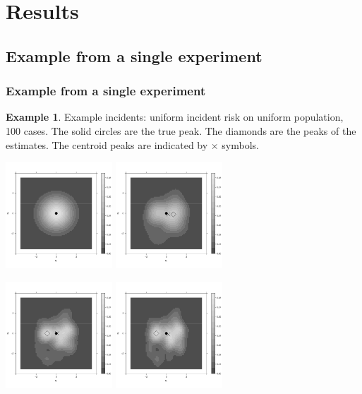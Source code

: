 \documentclass[notheorems]{beamer}
\theoremstyle{definition}
\theoremstyle{example}
\newtheorem{example}{Example}
\begin{document}
\section{Results}

\subsection{Example from a single experiment}
\begin{frame}\frametitle{Example from a single experiment}
    \begin{example}
        {   \tiny
            Example incidents: uniform incident risk on uniform population, 100 cases.
            The solid circles are the true peak.
            The diamonds are the peaks of the estimates.
            The centroid peaks are indicated by $\times$ symbols.
        }
        \centerline{
             \includegraphics[width=0.3\textwidth]{results/unif_100_1.0_1h/output/true_intensity_heatmap}
             \includegraphics[width=0.3\textwidth]{results/unif_100_1.0_1h/output/oracle_intensity_heatmap}
        }
        \centerline{
             \includegraphics[width=0.3\textwidth]{results/unif_100_1.0_1h/output/silverman_intensity_heatmap}
             \includegraphics[width=0.3\textwidth]{results/unif_100_1.0_1h/output/CV_intensity_heatmap}
}
\end{example}
\end{frame}
\end{document}
